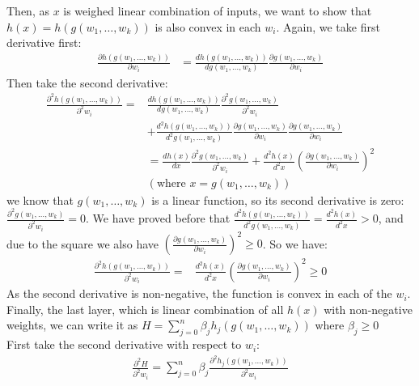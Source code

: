 \documentclass[11pt]{article}
\begin{document}
\begin{enumerate}
\begin{answertext}{14cm}{}
\end{answertext} 
\begin{answertext}{22cm}{}
Then, as $x$ is weighed linear combination of inputs, we want to show that $h(x)=h(g(w_1, \ldots, w_k))$ is also convex in each $w_i$. Again, we take first derivative first:
\begin{align*}
\frac{\partial h(g(w_1, \ldots, w_k))}{\partial w_i} & = \frac{dh(g(w_1, \ldots, w_k))}{dg(w_1, \ldots, w_k)}\frac{\partial g(w_1, \ldots, w_k)}{\partial w_i}
\end{align*}
Then take the second derivative:
\begin{align*}
\frac{\partial^2 h(g(w_1, \ldots, w_k))}{\partial^2 w_i}  =& \frac{dh(g(w_1, \ldots, w_k))}{dg(w_1, \ldots, w_k)}\frac{\partial^2 g(w_1, \ldots, w_k)}{\partial^2 w_i} \\
&+\frac{d^2h(g(w_1, \ldots, w_k))}{d^2g(w_1, \ldots, w_k)}\frac{\partial g(w_1, \ldots, w_k)}{\partial w_i}\frac{\partial g(w_1, \ldots, w_k)}{\partial w_i}\\
&= \frac{dh(x)}{dx}\frac{\partial^2g(w_1, \ldots, w_k)}{\partial^2w_i}+\frac{d^2h(x)}{d^2x}(\frac{\partial g(w_1, \ldots, w_k)}{\partial w_i})^2\\
&(\text{where } x = g(w_1, \ldots, w_k))
\end{align*}
we know that $g(w_1, \ldots, w_k)$ is a linear function, so its second derivative is zero: $\frac{\partial^2g(w_1, \ldots, w_k)}{\partial^2w_i} = 0$. We have proved before that $\frac{d^2h(g(w_1, \ldots, w_k))}{d^2g(w_1, \ldots, w_k)}=\frac{d^2h(x)}{d^2x}>0$, and due to the square we also have $(\frac{\partial g(w_1, \ldots, w_k)}{\partial w_i})^2 \geq 0$. So we have:
\begin{align*}
\frac{\partial^2h(g(w_1, \ldots, w_k))}{\partial^2w_i}  =& \frac{d^2h(x)}{d^2x}(\frac{\partial g(w_1, \ldots, w_k)}{\partial w_i})^2 \geq 0
\end{align*}
As the second derivative is non-negative, the function is convex in each of the $w_i$.\\
Finally, the last layer, which is linear combination of all $h(x)$ with non-negative weights, we can write it as $H = \sum_{j=0}^{n}\beta_jh_j(g(w_1, \ldots, w_k))$ where $\beta_j\geq 0$ \\
First take the second derivative with respect to $w_i$:
\begin{align*}
\frac {\partial^2 H}{\partial^2 w_i} = \sum_{j=0}^{n}\beta_j\frac{\partial^2h_j(g(w_1, \ldots, w_k))}{\partial^2 w_i}
\end{align*}

\end{answertext}
\end{enumerate}
\end{document}
